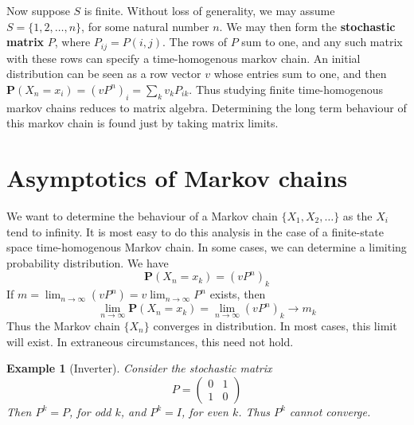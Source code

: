 \documentclass[12pt]{report}
\theoremstyle{plain}
\newtheorem*{example}{Example}
\theoremstyle{definition}
\begin{document}
Now suppose $S$ is finite. Without loss of generality, we may assume $S = \{ 1, 2, \dots, n \}$, for some natural number $n$. We may then form the {\bf stochastic matrix} $P$, where $P_{ij} = P(i,j)$. The rows of $P$ sum to one, and any such matrix with these rows can specify a time-homogenous markov chain. An initial distribution can be seen as a row vector $v$ whose entries sum to one, and then $\mathbf{P}(X_n = x_i) = (vP^n)_i = \sum_k v_k P_{ik}$. Thus studying finite time-homogenous markov chains reduces to matrix algebra. Determining the long term behaviour of this markov chain is found just by taking matrix limits.

\section{Asymptotics of Markov chains}

We want to determine the behaviour of a Markov chain $\{ X_1, X_2, \dots \}$ as the $X_i$ tend to infinity. It is most easy to do this analysis in the case of a finite-state space time-homogenous Markov chain. In some cases, we can determine a limiting probability distribution. We have
%
\[ \mathbf{P}(X_n = x_k) = (vP^n)_k \]
%
If $m = \lim_{n \to \infty} (vP^n) = v \lim_{n \to \infty} P^n$ exists, then
%
\[ \lim_{n \to \infty} \mathbf{P}(X_n = x_k) = \lim_{n \to \infty} (vP^n)_k \to m_k \]
%
Thus the Markov chain $\{ X_n \}$ converges in distribution. In most cases, this limit will exist. In extraneous circumstances, this need not hold.

\begin{example}[Inverter]
    Consider the stochastic matrix
    \[ P = \begin{pmatrix} 0 & 1 \\ 1 & 0 \end{pmatrix} \]
    Then $P^k = P$, for odd $k$, and $P^k = I$, for even $k$. Thus $P^k$ cannot converge.
\end{example}
\end{document}
